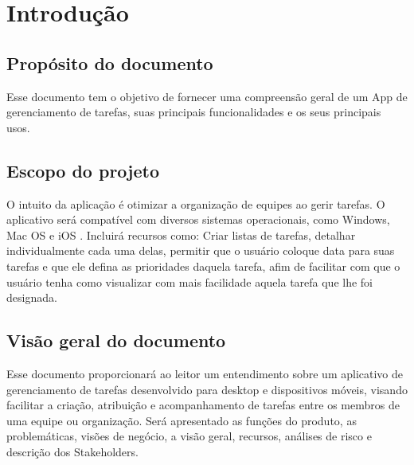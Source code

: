 \chapter{Introdução}
\section{Propósito do documento}
Esse documento tem o objetivo de fornecer uma compreensão geral de um App de gerenciamento de tarefas, suas principais funcionalidades e os seus principais usos.
\section{Escopo do projeto}
O intuito da aplicação é otimizar a organização de equipes ao gerir tarefas. O aplicativo será compatível com diversos sistemas operacionais, como Windows, Mac OS e iOS . Incluirá recursos como: Criar listas de tarefas, detalhar individualmente cada uma delas, permitir que o usuário coloque data para suas tarefas e que ele defina as prioridades daquela tarefa, afim de facilitar com que o usuário tenha como visualizar com mais facilidade aquela tarefa que lhe foi designada.
\section{Visão geral do documento}
Esse documento proporcionará ao leitor um entendimento sobre um aplicativo de gerenciamento de tarefas desenvolvido para desktop e dispositivos móveis, visando facilitar a criação, atribuição e acompanhamento de tarefas entre os membros de uma equipe ou organização. Será apresentado as funções do produto, as problemáticas, visões de negócio, a visão geral, recursos, análises de risco e descrição dos Stakeholders.
